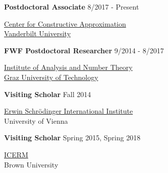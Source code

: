 \documentclass[10pt]{article}
\newenvironment{innerlist}[1][\enskip\textbullet]%
        {\begin{compactitem}[#1]}{\end{compactitem}}
\begin{document}
\hfill\newline
\textbf{Postdoctoral Associate} \hfill {8/2017 - Present}
\begin{innerlist}
\item[] \href{https://math.vanderbilt.edu/dept/cca/index.html}{Center for Constructive Approximation}\\
        \href{https://www.vanderbilt.edu/}{Vanderbilt University}
\end{innerlist}

\hfill\newline
\textbf{FWF Postdoctoral Researcher} \hfill {9/2014 - 8/2017}
\begin{innerlist}

\item[] \href{https://finanz.math.tugraz.at/}{Institute of Analysis and Number Theory}\\
        \href{https://www.tugraz.at}{Graz University of Technology}
\end{innerlist}
\hfill\newline
\textbf{ Visiting Scholar} \hfill {Fall 2014}
 \begin{innerlist}
\item[] \href{https://www.esi.ac.at/}{Erwin Schr\"odinger International Institute}\\
University of Vienna 
\end{innerlist}

\hfill\newline
\textbf{ Visiting Scholar} \hfill {Spring 2015, Spring 2018}
 \begin{innerlist}
\item[] \href{https://icerm.brown.edu/home/index.php}{ICERM}\\
Brown University
\end{innerlist}
\end{document}
